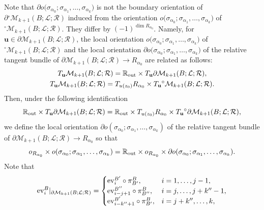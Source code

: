 \documentclass[pdftex]{sigma}
\numberwithin{equation}{section}
\theoremstyle{definition}
\begin{document}
Note that $\partial o\bigl(\sigma_{\alpha_0};\sigma_{\alpha_1}, \dots, \sigma_{\alpha_k}\bigr)$
is not the boundary orientation of $\partial {}^{\circ}{\mathcal M}_{k+1}(B; {\mathcal L}; {\mathcal R})$ induced from the orientation
$o\bigl(\sigma_{\alpha_0};\sigma_{\alpha_1}, \dots, \sigma_{\alpha_k}\bigr)$ of ${}^{\circ}{\mathcal M}_{k+1}(B; {\mathcal L}; {\mathcal R})$.
They differ by $(-1)^{\dim  R_{\alpha_0}}$.
Namely, for ${\mathbf u} \in \partial {\mathcal M}_{k+1}(B;{\mathcal L}; {\mathcal R})$, the local orientation
$o\bigl(\sigma_{\alpha_0};\sigma_{\alpha_1}, \dots, \sigma_{\alpha_k}\bigr)$ of
${}^{\circ}{\mathcal M}_{k+1}(B; {\mathcal L}; {\mathcal R})$ and the local orientation
$\partial o\bigl(\sigma_{\alpha_0};\sigma_{\alpha_1}, \dots, \sigma_{\alpha_k}\bigr)$
of the relative tangent bundle of $\partial {\mathcal M}_{k+1}(B;{\mathcal L}; {\mathcal R})\allowbreak \to R_{\alpha_0}$
are related as follows:
\begin{gather*}
T_{\mathbf u} {\mathcal M}_{k+1}(B;{\mathcal L}; {\mathcal R}) = {\mathbb R}_{\rm out} \times T_{\mathbf u} \partial {\mathcal M}_{k+1}(B;{\mathcal L}; {\mathcal R}),\\
T_{\mathbf u} {\mathcal M}_{k+1}(B;{\mathcal L}; {\mathcal R}) = T_{u(z_0)} R_{\alpha_0} \times T_{\mathbf u} {}^{\circ}{\mathcal M}_{k+1}(B; {\mathcal L}; {\mathcal R}).
\end{gather*}
Then, under the following identification
\[{\mathbb R}_{\rm out} \times T_{\mathbf u} \partial {\mathcal M}_{k+1}(B;{\mathcal L}; {\mathcal R}) ={\mathbb R}_{\rm out} \times T_{u(z_0)} R_{\alpha_0} \times
T_{\mathbf u} {}^{\circ} \partial {\mathcal M}_{k+1}(B; {\mathcal L}; {\mathcal R}),\]
we define the local orientation $\partial o(\sigma_{\alpha_0};\sigma_{\alpha_1}, \dots, \sigma_{\alpha_k})$ of the relative tangent bundle of
$\partial {\mathcal M}_{k+1}(B;\allowbreak {\mathcal L}; {\mathcal R}) \to R_{\alpha_0}$
so that
\[
o_{R_{\alpha_0}} \times o(\sigma_{\alpha_0};\sigma_{\alpha_1}, \dots, \sigma_{\alpha_k}) = {\mathbb R}_{\rm out} \times o_{R_{\alpha_0}} \times
\partial o(\sigma_{\alpha_0};\sigma_{\alpha_1}, \dots, \sigma_{\alpha_k}).
\]
Note that
\begin{equation*}
{\rm ev}_i^B\vert_{\partial {\mathcal M}_{k+1}(B; {\mathcal L}; {\mathcal R})}=
\begin{cases}
{\rm ev}_i^{B'} \circ \pi^B_{B'}, & i=1, \dots, j-1, \\
{\rm ev}_{i-j+1}^{B''} \circ \pi^B_{B''}, & i=j, \dots, j+k''-1, \\
{\rm ev}_{i-k''+1}^{B'} \circ \pi^B_{B'},& i=j+k'', \dots, k,
\end{cases}
\end{equation*}
\end{document}
